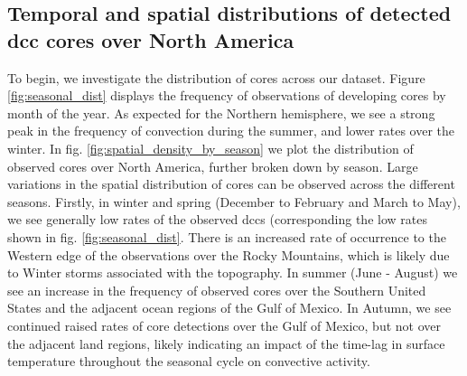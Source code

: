 


\subsection{Temporal and spatial distributions of detected \acrshort{dcc} cores over North America}


To begin, we investigate the distribution of cores across our dataset.
Figure \ref{fig:seasonal_dist} displays the frequency of observations of developing cores by month of the year.
As expected for the Northern hemisphere, we see a strong peak in the frequency of convection during the summer, and lower rates over the winter.
In fig. \ref{fig:spatial_density_by_season} we plot the distribution of observed cores over North America, further broken down by season.
Large variations in the spatial distribution of cores can be observed across the different seasons.
Firstly, in winter and spring (December to February and March to May), we see generally low rates of the observed \acrshort{dcc}s (corresponding the low rates shown in fig. \ref{fig:seasonal_dist}.
There is an increased rate of occurrence to the Western edge of the observations over the Rocky Mountains, which is likely due to Winter storms associated with the topography.
In summer (June - August) we see an increase in the frequency of observed cores over the Southern United States and the adjacent ocean regions of the Gulf of Mexico.
In Autumn, we see continued raised rates of core detections over the Gulf of Mexico, but not over the adjacent land regions, likely indicating an impact of the time-lag in surface temperature throughout the seasonal cycle on convective activity.


